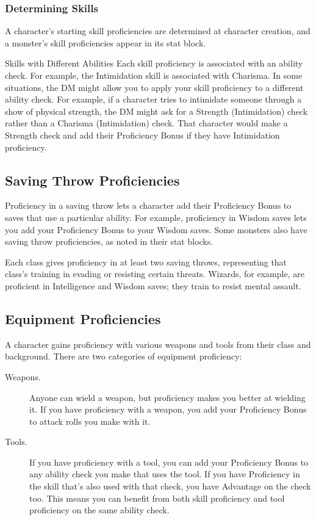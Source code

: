 \documentclass[10pt,a4paper,twoside,bg=print,twocolumn,openany,nodeprecatedcode]{dndbook}
\begin{document}
\subsubsection{Determining Skills}
A character's starting skill proficiencies are determined at character creation, and a monster's skill proficiencies appear in its stat block.

\begin{DndSidebar}[float=!b]{Skills with Different Abilities}
Each skill proficiency is associated with an ability check. For example, the Intimidation skill is associated with Charisma. In some situations, the DM might allow you to apply your skill proficiency to a different ability check. For example, if a character tries to intimidate someone through a show of physical strength, the DM might ask for a Strength (Intimidation) check rather than a Charisma (Intimidation) check. That character would make a Strength check and add their Proficiency Bonus if they have Intimidation proficiency.



\end{DndSidebar}

\subsection{Saving Throw Proficiencies}
Proficiency in a saving throw lets a character add their Proficiency Bonus to saves that use a particular ability. For example, proficiency in Wisdom saves lets you add your Proficiency Bonus to your Wisdom saves. Some monsters also have saving throw proficiencies, as noted in their stat blocks.

Each class gives proficiency in at least two saving throws, representing that class's training in evading or resisting certain threats. Wizards, for example, are proficient in Intelligence and Wisdom saves; they train to resist mental assault.

\subsection{Equipment Proficiencies}
A character gains proficiency with various weapons and tools from their class and background. There are two categories of equipment proficiency:


\begin{description}
\item[Weapons.]
Anyone can wield a weapon, but proficiency makes you better at wielding it. If you have proficiency with a weapon, you add your Proficiency Bonus to attack rolls you make with it.
\item[Tools.]
If you have proficiency with a tool, you can add your Proficiency Bonus to any ability check you make that uses the tool. If you have Proficiency in the skill that's also used with that check, you have Advantage on the check too. This means you can benefit from both skill proficiency and tool proficiency on the same ability check.
\end{description}
\end{document}

